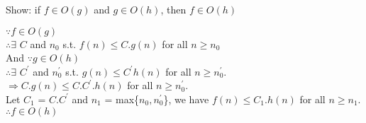 \documentclass{article}
\begin{document}
\begin{enumerate}
\LARGE{\item Show: if $f\in O(g)$ and $g\in O(h)$, then $f\in O(h)$}

\large{
  $\because f\in O(g)$ \\
  $\therefore \exists$ $C$ and $n_0$ s.t. $f(n)\le C.g(n)$ for all
  $n\ge n_0$ \\ 
  And 
  $\because g\in O(h)$ \\
  $\therefore \exists$ $C^{\prime}$ and $n_0^{\prime}$ s.t. $g(n)\le
  C^{\prime}h(n)$ for 
  all $n\ge n_0^{\prime}$. \\ 
  $\Rightarrow C.g(n) \le C.C^{\prime}.h(n)$ for all $n\ge
  n_0^{\prime}$. \\ 

  Let $C_1$ = $C.C^{\prime}$ and $n_1$ = max\{$n_0, n_0^{\prime}$\}, we have 
  $f(n) \le C_1.h(n)$ for all $n\ge n_1$. \\ 
  $\therefore f\in O(h)$
}
\end{enumerate}
\end{document}
